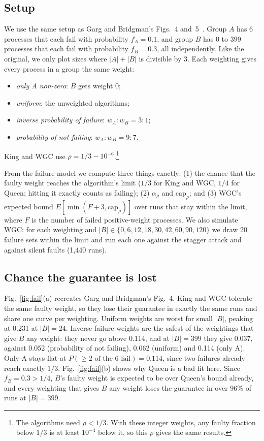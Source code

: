 \documentclass[conference]{IEEEtran}
\theoremstyle{definition}
\newcommand{\capr}{\mathrm{cap}_\rho}
\begin{document}
\subsection{Setup}
We use the same setup as Garg and Bridgman's Figs.~4 and~5~\cite{garg2011}. Group $A$ has 6 processes that each fail with probability $f_A=0.1$, and group $B$ has 0 to 399 processes that each fail with probability $f_B=0.3$, all independently. Like the original, we only plot sizes where $|A|+|B|$ is divisible by 3. Each weighting gives every process in a group the same weight:
\begin{itemize}
\item \emph{only A non-zero}: $B$ gets weight 0;
\item \emph{uniform}: the unweighted algorithms;
\item \emph{inverse probability of failure}: $w_A:w_B=3:1$;
\item \emph{probability of not failing}: $w_A:w_B=9:7$.
\end{itemize}
King and WGC use $\rho=1/3-10^{-6}$.\footnote{The algorithms need $\rho<1/3$. With these integer weights, any faulty fraction below $1/3$ is at least $10^{-4}$ below it, so this $\rho$ gives the same results.}

From the failure model we compute three things exactly: (1) the chance that the faulty weight reaches the algorithm's limit ($1/3$ for King and WGC, $1/4$ for Queen; hitting it exactly counts as failing); (2) $\alpha_\rho$ and $\capr$; and (3) WGC's expected bound $E[\min(F+3,\capr)]$ over runs that stay within the limit, where $F$ is the number of failed positive-weight processes. We also simulate WGC: for each weighting and $|B|\in\{0,6,12,18,30,42,60,90,120\}$ we draw 20 failure sets within the limit and run each one against the stagger attack and against silent faults (1{,}440 runs).

\subsection{Chance the guarantee is lost}

Fig.~\ref{fig:fail}(a) recreates Garg and Bridgman's Fig.~4. King and WGC tolerate the same faulty weight, so they lose their guarantee in exactly the same runs and share one curve per weighting. Uniform weights are worst for small $|B|$, peaking at 0.231 at $|B|=24$. Inverse-failure weights are the safest of the weightings that give $B$ any weight: they never go above 0.114, and at $|B|=399$ they give 0.037, against 0.052 (probability of not failing), 0.062 (uniform) and 0.114 (only A). Only-A stays flat at $P(\ge 2\text{ of the 6 fail})=0.114$, since two failures already reach exactly $1/3$. Fig.~\ref{fig:fail}(b) shows why Queen is a bad fit here. Since $f_B=0.3>1/4$, $B$'s faulty weight is expected to be over Queen's bound already, and every weighting that gives $B$ any weight loses the guarantee in over 96\% of runs at $|B|=399$.
\end{document}

